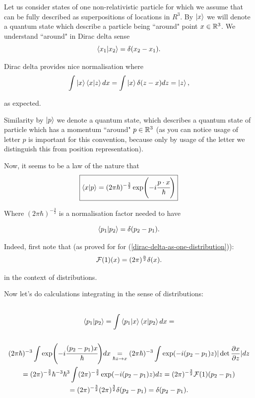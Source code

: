 \documentclass[main.tex]{subfiles}
\begin{document}
Let us consider states of one non-relativistic particle for which we assume that can be fully described as superpositions of locations in $R^3$. By $\ket{x}$ we will denote a quantum state which describe a particle being ``around" point $x\in \mathbb{R}^3$. We understand ``around" in Dirac delta sense
\begin{equation}
\bra{x_1}\ket{x_2} = \delta(x_2 - x_1).
\end{equation}

Dirac delta provides nice normalisation where
\begin{equation}
\int \ket{x}\bra{x}\ket{z}dx = \int \ket{x}\delta(z - x) dz = \ket{z},  
\end{equation}    

as expected.

Similarity by $\ket{p}$ we denote a quantum state, which describes a quantum state of particle which has a momentum ``around" $p\in \mathbb{R}^3$ (as you can notice usage of letter $p$ is important for this convention, because only by usage of the letter we distinguish this from position representation).

Now, it seems to be a law of the nature that
\begin{equation}
\boxed{
\bra{x}\ket{p} = (2\pi\hbar)^{-\frac{3}{2}} \exp(-i\cfrac{p\cdot x}{\hbar})
}
\end{equation}

Where $(2\pi\hbar)^{-\frac{3}{2}}$ is a normalisation factor needed to have 

\begin{equation}
\bra{p_1}\ket{p_2} = \delta(p_2 - p_1).
\end{equation} 

Indeed, first note that (as proved for for (\ref{dirac-delta-as-one-distribution})):
\begin{equation}
\mathcal{F}(1)(x) = (2\pi)^\frac{n}{2}\delta(x). 
\end{equation}

in the context of distributions.

Now let's do calculations integrating in the sense of distributions:
\begin{multline*}\\
\bra{p_1}\ket{p_2} = \int\bra{p_1} \ket{x}\bra{x} \ket{p_2} dx = \\
\\ (2\pi\hbar)^{-3} \int \exp(-i \cfrac{(p_2 - p_1)x}{\hbar})dx \underset{\hbar z\to x}{=}
(2\pi\hbar)^{-3} \int \exp(-i(p_2 - p_1)z) |\det \frac{\partial x}{\partial z}|dz
\\ = (2\pi)^{-\frac{3}{2}} \hbar^{-3} \hbar^3 \int (2\pi)^{-\frac{3}{2}} \exp(-i(p_2 - p_1)z)dz = (2\pi)^{-\frac{3}{2}} \mathcal{F}(1)(p_2 - p_1)
\\ = (2\pi)^{-\frac{3}{2}} (2\pi)^{\frac{3}{2}} \delta(p_2 - p_1) = \delta(p_2 - p_1).
\\
\end{multline*}
\end{document}
